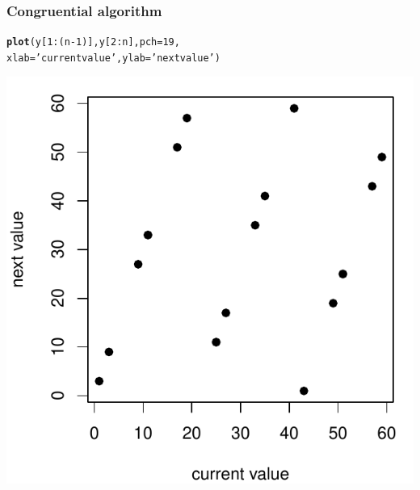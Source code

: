 \documentclass[12pt]{beamer}\usepackage[]{graphicx}\usepackage[]{color}
\makeatletter
\newcommand{\hlnum}[1]{\textcolor[rgb]{0.686,0.059,0.569}{#1}}%
\newcommand{\hlstr}[1]{\textcolor[rgb]{0.192,0.494,0.8}{#1}}%
\newcommand{\hlopt}[1]{\textcolor[rgb]{0,0,0}{#1}}%
\newcommand{\hlstd}[1]{\textcolor[rgb]{0.345,0.345,0.345}{#1}}%
\newcommand{\hlkwc}[1]{\textcolor[rgb]{0.333,0.667,0.333}{#1}}%
\newcommand{\hlkwd}[1]{\textcolor[rgb]{0.737,0.353,0.396}{\textbf{#1}}}%
\newenvironment{kframe}{%
 \def\at@end@of@kframe{}%
 \ifinner\ifhmode%
  \def\at@end@of@kframe{\end{minipage}}%
  \begin{minipage}{\columnwidth}%
 \fi\fi%
 \def\FrameCommand##1{\hskip\@totalleftmargin \hskip-\fboxsep
 \colorbox{shadecolor}{##1}\hskip-\fboxsep
     \hskip-\linewidth \hskip-\@totalleftmargin \hskip\columnwidth}%
 \MakeFramed {\advance\hsize-\width
   \@totalleftmargin\z@ \linewidth\hsize
   \@setminipage}}%
 {\par\unskip\endMakeFramed%
 \at@end@of@kframe}
\newenvironment{knitrout}{}{} %
\makeatother
\begin{document}

\begin{frame}[fragile]
\frametitle{Congruential algorithm}
\begin{knitrout}\tiny
{}\color{fgcolor}\begin{kframe}
\begin{alltt}
\hlkwd{plot}\hlstd{(y[}\hlnum{1}\hlopt{:}\hlstd{(n}\hlopt{-}\hlnum{1}\hlstd{)], y[}\hlnum{2}\hlopt{:}\hlstd{n],} \hlkwc{pch} \hlstd{=} \hlnum{19}\hlstd{,}
     \hlkwc{xlab} \hlstd{=} \hlstr{'current value'}\hlstd{,} \hlkwc{ylab} \hlstd{=} \hlstr{'next value'}\hlstd{)}
\end{alltt}
\end{kframe}

{\centering \includegraphics[width=.6\linewidth,height=.6\linewidth]{figure/unnamed-chunk-3-1} 

}



\end{knitrout}

\end{frame}

\end{document}
